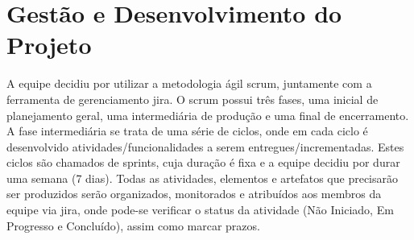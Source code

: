 \section{Gestão e Desenvolvimento do Projeto}
A equipe decidiu por utilizar a metodologia ágil \gls{scrum}, juntamente com a ferramenta de gerenciamento \gls{jira}. O \gls{scrum} possui três fases, uma inicial de planejamento geral, uma intermediária de produção e uma final de encerramento. A fase intermediária se trata de uma série de ciclos, onde em cada ciclo é desenvolvido atividades/funcionalidades a serem entregues/incrementadas. Estes ciclos são chamados de \glspl{sprint}, cuja duração é fixa e a equipe decidiu por durar uma semana (7 dias). Todas as atividades, elementos e artefatos que precisarão ser produzidos serão organizados, monitorados e atribuídos aos membros da equipe via \gls{jira}, onde pode-se verificar o status da atividade (Não Iniciado, Em Progresso e Concluído), assim como marcar prazos.